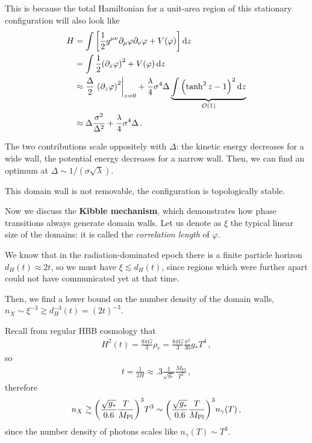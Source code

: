 \documentclass[main.tex]{subfiles}
\begin{document}
This is because the total Hamiltonian for a unit-area region of this stationary configuration will also look like 
%
\begin{align}
H &= \int \qty[\frac{1}{2} g^{\mu \nu } \partial_{\mu } \varphi \partial_{\nu } \varphi + V(\varphi ) ] \dd{z}  \\
&= \int \frac{1}{2} \qty(\partial_{z} \varphi )^2 + V(\varphi ) \dd{z}  \\
&\approx \frac{\Delta}{2} \eval{\qty(\partial_{z} \varphi)^2}_{z=0} + \frac{\lambda}{4} \sigma^4 \Delta  \underbrace{\int \qty(\tanh^2 z - 1)^2 \dd{z}}_{\order{1}}   \\
&\approx \Delta \frac{\sigma^2}{\Delta^2} + \frac{\lambda}{4} \sigma^4 \Delta 
\,.
\end{align}


The two contributions scale oppositely with \(\Delta \): the kinetic energy decreases for a wide wall, the potential energy decreases for a narrow wall. 
Then, we can find an optimum at \(\Delta \sim 1 / (\sigma \sqrt{\lambda })\). 

This domain wall is not removable, the configuration is topologically stable. 

Now we discuss the \textbf{Kibble mechanism}, which demonstrates how phase transitions always generate domain walls. 
Let us denote as \(\xi \) the typical linear size of the domains: it is called the \emph{correlation length} of \(\varphi \). 

We know that in the radiation-dominated epoch there is a finite particle horizon \(d_H(t) \approx 2 t\), so we must have \(\xi \lesssim d_H (t)\), since regions which were further apart could not have communicated yet at that time. 

Then, we find a lower bound on the number density of the domain walls, \(n_X \sim \xi^{-3} \gtrsim d_H^{-3}(t) = (2t)^{-3}\). 

Recall from regular HBB cosmology that 
%
\begin{align}
H^2(t) = \frac{8 \pi G}{3} \rho _r = \frac{8 \pi G}{3} \frac{\pi^2}{30} g_* T^{4}
\,,
\end{align}
%
so 
%
\begin{align}
t = \frac{1}{2 H} \approx \num{.3} \frac{1}{\sqrt{g_*}} \frac{M _{\text{Pl}}}{T^2}
\,,
\end{align}
%
therefore 
%
\begin{align}
n_X \gtrsim \qty(\frac{\sqrt{g_*}}{\num{.6}} \frac{T}{M _{\text{Pl}}})^3 T^3 \sim \qty(\frac{\sqrt{g_*}}{\num{.6}} \frac{T}{ M _{\text{Pl}}})^3 n_\gamma (T)
\,,
\end{align}
%
since the number density of photons scales like \(n_\gamma (T) \sim T^3\).
\end{document}
